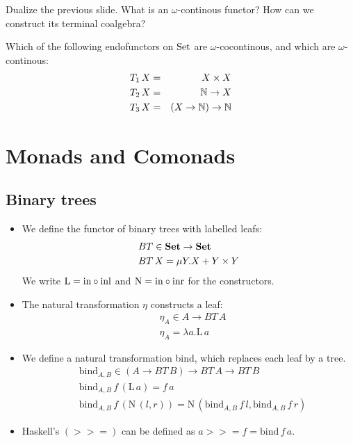 \documentclass[handout]{beamer}
\begin{document}
\begin{frame}
  \begin{exercise}
    Dualize the previous slide. What is an $\omega$-continous functor? How can we construct 
    its terminal coalgebra?
  \end{exercise}

  \begin{exercise}
    Which of the following endofunctors on $\mathrm{Set}$ are $\omega$-cocontinous, and
    which are $\omega$-continous:
    \begin{eqnarray*}
      T_1\,X & = & X\times X \\
      T_2\,X & = & \mathbb{N} \to X\\
      T_3\,X & = & (X \to \mathbb{N}) \to \mathbb{N}
    \end{eqnarray*}
  \end{exercise}

\end{frame}

\section{Monads and Comonads}

\subsection{Binary trees}

\begin{frame}
  
  \begin{itemize}
  \item We define the functor of binary trees with labelled leafs:
    \begin{align*}
      & BT \in \mathbf{Set} \to \mathbf{Set}\\
      & BT\,X = \mu Y. X + Y\times Y
    \end{align*}
    We write $\mathrm{L} = \mathrm{in} \circ \mathrm{inl}$ and $\mathrm{N} = \mathrm{in} \circ \mathrm{inr}$ for the constructors.
  \item The natural transformation $\eta$ constructs a leaf:
    \begin{align*}
      & \eta_A \in A \to BT\,A\\
      & \eta_A = \lambda a.\mathrm{L}\,a
    \end{align*}

  \item We define a natural transformation \textrm{bind}, which replaces each leaf by a tree.
  \begin{align*}
      & \mathrm{bind}_{A,B}\in (A \to BT\,B) \to BT\,A \to BT\,B \\
      & \mathrm{bind}_{A,B}\,f\,(\mathrm{L}\,a) = f\,a\\
      & \mathrm{bind}_{A,B}\,f\, (\mathrm{N}\,(l,r)) = \mathrm{N}\,
      (\mathrm{bind}_{A,B}\,f\,l,\mathrm{bind}_{A,B}\,f\,r)
    \end{align*}

  \item Haskell's $(>>=)$ can be defined as $a >>= f = \mathrm{bind}\,f\,a$.
  \end{itemize}

\end{frame}
\end{document}
